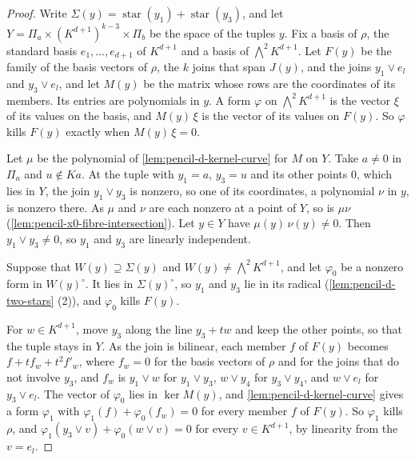 \begin{proof}
  \leanok
  Write $\Sigma(y) = \operatorname{star}(y_1) + \operatorname{star}(y_3)$,
  and let $Y = \Pi_a \times (K^{d+1})^{k-3} \times \Pi_b$ be the space of
  the tuples $y$. Fix a basis of $\rho$, the standard basis
  $e_1, \dots, e_{d+1}$ of $K^{d+1}$ and a basis of
  $\bigwedge^2 K^{d+1}$. Let $F(y)$ be the family of the basis vectors of
  $\rho$, the $k$ joins that span $J(y)$, and the joins $y_1 \vee e_l$ and
  $y_3 \vee e_l$, and let $M(y)$ be the matrix whose rows are the
  coordinates of its members. Its entries are polynomials in $y$. A form
  $\varphi$ on $\bigwedge^2 K^{d+1}$ is the vector $\xi$ of its values on
  the basis, and $M(y)\, \xi$ is the vector of its values on $F(y)$. So
  $\varphi$ kills $F(y)$ exactly when $M(y)\, \xi = 0$.

  Let $\mu$ be the polynomial of \cref{lem:pencil-d-kernel-curve} for
  $M$ on $Y$. Take $a \neq 0$ in $\Pi_a$ and $u \notin K a$. At the tuple
  with $y_1 = a$, $y_3 = u$ and its other points $0$, which lies in $Y$,
  the join $y_1 \vee y_3$ is nonzero, so one of its coordinates, a
  polynomial $\nu$ in $y$, is nonzero there. As $\mu$ and $\nu$ are each
  nonzero at a point of $Y$, so is $\mu \nu$
  (\cref{lem:pencil-x0-fibre-intersection}). Let $y \in Y$ have
  $\mu(y)\, \nu(y) \neq 0$. Then $y_1 \vee y_3 \neq 0$, so $y_1$ and $y_3$
  are linearly independent.

  Suppose that $W(y) \supseteq \Sigma(y)$ and
  $W(y) \neq \bigwedge^2 K^{d+1}$, and let $\varphi_0$ be a nonzero form
  in $W(y)^{\circ}$. It lies in $\Sigma(y)^{\circ}$, so $y_1$ and $y_3$
  lie in its radical (\cref{lem:pencil-d-two-stars} (2)), and
  $\varphi_0$ kills $F(y)$.

  For $w \in K^{d+1}$, move $y_3$ along the line $y_3 + tw$ and keep the
  other points, so that the tuple stays in $Y$. As the join is bilinear,
  each member $f$ of $F(y)$ becomes $f + t f_w + t^2 f'_w$, where
  $f_w = 0$ for the basis vectors of $\rho$ and for the joins that do not
  involve $y_3$, and $f_w$ is $y_1 \vee w$ for $y_1 \vee y_3$,
  $w \vee y_4$ for $y_3 \vee y_4$, and $w \vee e_l$ for $y_3 \vee e_l$.
  The vector of $\varphi_0$ lies in $\ker M(y)$, and
  \cref{lem:pencil-d-kernel-curve} gives a form $\varphi_1$ with
  $\varphi_1(f) + \varphi_0(f_w) = 0$ for every member $f$ of $F(y)$. So
  $\varphi_1$ kills $\rho$, and
  $\varphi_1(y_3 \vee v) + \varphi_0(w \vee v) = 0$ for every
  $v \in K^{d+1}$, by linearity from the $v = e_l$.


\end{proof}

